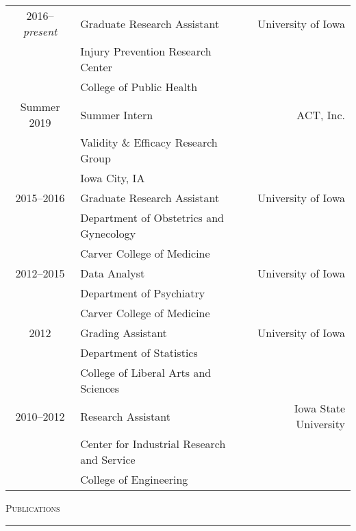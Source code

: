 \documentclass[a4paper]{article}
\begin{document}
\begin{tabular*}{0.95\textwidth}{@{\extracolsep{\fill}}clr}
  2016--\textit{present} & Graduate Research Assistant & University of Iowa \\
   & Injury Prevention Research Center & \\
   & College of Public Health & \\[3pt]
  Summer 2019 & Summer Intern & ACT, Inc. \\
    & Validity \& Efficacy Research Group & \\
    & Iowa City, IA & \\[3pt]
  2015--2016 & Graduate Research Assistant & University of Iowa \\
   & Department of Obstetrics and Gynecology & \\
   & Carver College of Medicine & \\
  2012--2015 & Data Analyst & University of Iowa \\
   & Department of Psychiatry & \\
   & Carver College of Medicine & \\[3pt]
  2012 & Grading Assistant & University of Iowa \\
   & Department of Statistics & \\
   & College of Liberal Arts and Sciences & \\[3pt]
  2010--2012 & Research Assistant & Iowa State University \\
   & Center for Industrial Research and Service \\
   & College of Engineering &
\end{tabular*}
\vspace{0.25\baselineskip}


\begin{flushleft}
  \Large\textsc{Publications}
  \textcolor{usafagrey}{\rule[0.5\baselineskip]{\textwidth}{0.75pt}}
\end{flushleft}
\vspace{-1.5\baselineskip}
\end{document}
